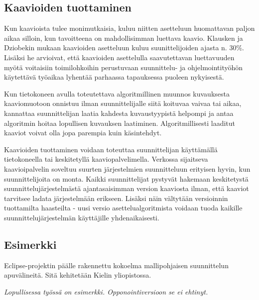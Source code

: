\documentclass[finnish,12pt]{article}
\begin{document}
		\subsection{Kaavioiden tuottaminen}

Kun kaavioista tulee monimutkaisia, kuluu niitten asetteluun huomattavan paljon aikaa silloin, kun tavoitteena on mahdollisimman luettava kaavio.
Klausken ja Dziobekin mukaan kaavioiden asetteluun kuluu suunittelijoiden ajasta n. 30\%.
Lisäksi he arvioivat, että kaavioiden asettelulla saavutettavan luettavuuden myötä voitaisiin toimilohkoihin perustuvaan suunnittelu- ja ohjelmointityöhön käytettävä työaikaa lyhentää parhaassa tapauksessa puoleen nykyisestä. \cite{Refworks:63}

Kun tietokoneen avulla toteutettava algoritmillinen muunnos kuvauksesta kaaviomuotoon onnistuu ilman suunnittelijalle siitä koituvaa vaivaa tai aikaa, kannattaa suunnittelijan laatia kahdesta kuvaustyypistä helpompi ja antaa algoritmin hoitaa lopullisen kuvauksen laatiminen.
Algoritmillisesti laaditut kaaviot voivat olla jopa parempia kuin käsintehdyt.

Kaavioiden tuottaminen voidaan toteuttaa suunnittelijan käyttämällä tietokoneella tai keskitetyllä kaaviopalvelimella.
Verkossa sijaitseva kaavioipalvelin soveltuu suurten järjestelmien suunnitteluun erityisen hyvin, kun suunnittelijoita on monta.
Kaikki suunnittelijat pystyvät hakemaan keskitetystä suunnittelujärjestelmästä ajantasaisimman version kaaviosta ilman, että kaaviot tarvitsee ladata järjestelmään erikseen.
Lisäksi näin vältytään versioinnin tuottamilta haasteilta - uusi versio asettelualgoritmista voidaan tuoda kaikille suunnittelujärjestelmän käyttäjille yhdenaikaisesti.

		\subsection{Esimerkki}

Eclipse-projektin päälle rakennettu kokoelma mallipohjaisen suunnittelun apuvälineitä. Sitä kehitetään Kielin yliopistossa.

		\emph{Lopullisessa työssä on esimerkki. Opponointiversioon se ei ehtinyt.}


\end{document}
